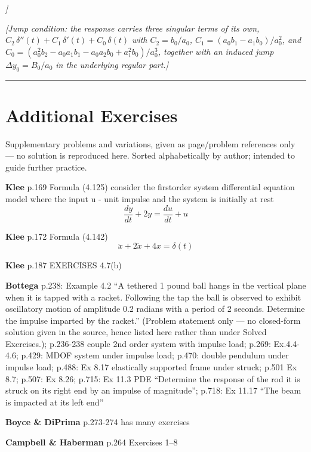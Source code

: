 \documentclass[
  11pt,
]{article}
\begin{document}
\emph{{]}}

\emph{{[}Jump condition: the response carries three singular terms of
its own, \(C_2\,\delta''(t) + C_1\,\delta'(t) + C_0\,\delta(t)\) with
\(C_2 = b_0/a_0\), \(C_1 = (a_0 b_1 - a_1 b_0)/a_0^2\), and
\(C_0 = (a_0^2 b_2 - a_0 a_1 b_1 - a_0 a_2 b_0 + a_1^2 b_0)/a_0^3\),
together with an induced jump \(\Delta y_0 = B_0/a_0\) in the underlying
regular part.{]}}

\begin{center}\rule{0.5\linewidth}{0.5pt}\end{center}

\hypertarget{additional-exercises}{%
\section{Additional Exercises}\label{additional-exercises}}

Supplementary problems and variations, given as page/problem references
only --- no solution is reproduced here. Sorted alphabetically by
author; intended to guide further practice.

\textbf{Klee} p.169 Formula (4.125) consider the firstorder system
differential equation model where the input u - unit impulse and the
system is initially at rest \[
\frac{dy}{dt} + 2y = \frac{du}{dt} + u
\]

\textbf{Klee} p.172 Formula (4.142) \[
\ddot{x} + 2\dot{x} + 4x = \delta(t)
\]

\textbf{Klee} p.187 EXERCISES 4.7(b)

\textbf{Bottega} p.238: Example 4.2 ``A tethered 1 pound ball hangs in
the vertical plane when it is tapped with a racket. Following the tap
the ball is observed to exhibit oscillatory motion of amplitude 0.2
radians with a period of 2 seconds. Determine the impulse imparted by
the racket.'' (Problem statement only --- no closed-form solution given
in the source, hence listed here rather than under Solved Exercises.);
p.236-238 couple 2nd order system with impulse load; p.269: Ex.4.4-4.6;
p.429: MDOF system under impulse load; p.470: double pendulum under
impulse load; p.488: Ex 8.17 elastically supported frame under struck;
p.501 Ex 8.7; p.507: Ex 8.26; p.715: Ex 11.3 PDE ``Determine the
response of the rod it is struck on its right end by an impulse of
magnitude''; p.718: Ex 11.17 ``The beam is impacted at its left end''

\textbf{Boyce \& DiPrima} p.273-274 has many exercises

\textbf{Campbell \& Haberman} p.264 Exercises 1--8
\end{document}
